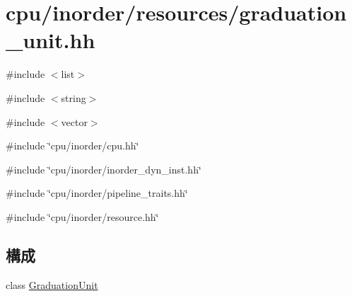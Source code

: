 \hypertarget{graduation__unit_8hh}{
\section{cpu/inorder/resources/graduation\_\-unit.hh}
\label{graduation__unit_8hh}
}
{\ttfamily \#include $<$list$>$}\par
{\ttfamily \#include $<$string$>$}\par
{\ttfamily \#include $<$vector$>$}\par
{\ttfamily \#include \char`\"{}cpu/inorder/cpu.hh\char`\"{}}\par
{\ttfamily \#include \char`\"{}cpu/inorder/inorder\_\-dyn\_\-inst.hh\char`\"{}}\par
{\ttfamily \#include \char`\"{}cpu/inorder/pipeline\_\-traits.hh\char`\"{}}\par
{\ttfamily \#include \char`\"{}cpu/inorder/resource.hh\char`\"{}}\par
\subsection*{構成}
\begin{DoxyCompactItemize}
\item 
class \hyperlink{classGraduationUnit}{GraduationUnit}
\end{DoxyCompactItemize}
